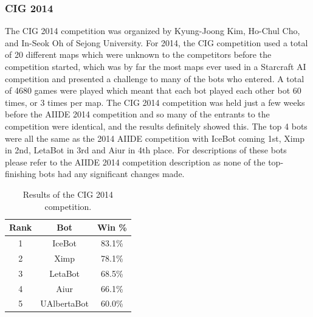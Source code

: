 \documentclass{llncs}
\begin{document}
\subsubsection{CIG 2014}
The CIG 2014 competition was organized by Kyung-Joong Kim, Ho-Chul Cho, and In-Seok Oh of Sejong University. For 2014, the CIG competition used a total of 20 different maps which were unknown to the competitors before the competition started, which was by far the most maps ever used in a Starcraft AI competition and presented a challenge to many of the bots who entered. A total of 4680 games were played which meant that each bot played each other bot 60 times, or 3 times per map. The CIG 2014 competition was held just a few weeks before the AIIDE 2014 competition and so many of the entrants to the competition were identical, and the results definitely showed this. The top 4 bots were all the same as the 2014 AIIDE competition with IceBot coming 1st, Ximp in 2nd, LetaBot in 3rd and Aiur in 4th place. For descriptions of these bots please refer to the AIIDE 2014 competition description as none of the top-finishing bots had any significant changes made.

\begin{table}[t]
\caption{Results of the CIG 2014 competition.}
\label{tab:cig2014}
\centering
\begin{tabular}{|c|c|c|}
\hline
{\bfseries Rank} & {\bfseries Bot} & {\bfseries Win \%} \\
\hline
1 & IceBot & 83.1\% \\
2 & Ximp & 78.1\% \\
3 & LetaBot & 68.5\% \\
4 & Aiur & 66.1\% \\
5 & UAlbertaBot & 60.0\% \\ 
\hline
\end{tabular}
\end{table}
\end{document}
